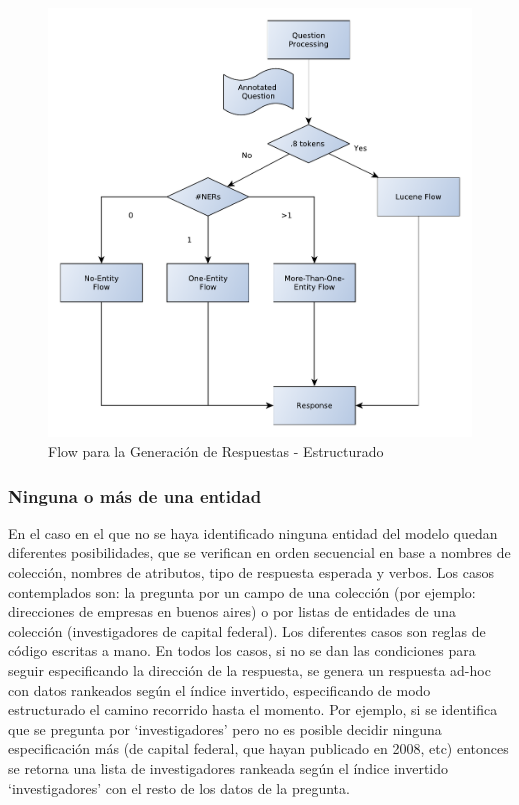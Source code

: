 \begin{figure}[H]
  \centering
    \includegraphics[scale=0.5]{graficos/AnswerRetrievalFlowEstructurado}
  \caption{Flow para la Generación de Respuestas - Estructurado}
  \label{fig:AnswerRetrievalFlowEstructurado}
\end{figure}

\subsubsection*{Ninguna o más de una entidad}
En el caso en el que no se haya identificado ninguna entidad del modelo quedan diferentes posibilidades, que se verifican en orden secuencial en base a nombres de colección, nombres de atributos, tipo de respuesta esperada y verbos. Los casos contemplados son: la pregunta por un campo de una colección (por ejemplo: direcciones de empresas en buenos aires) o por listas de entidades de una colección (investigadores de capital federal). Los diferentes casos son reglas de código escritas a mano. En todos los casos, si no se dan las condiciones para seguir especificando la dirección de la respuesta, se genera un respuesta ad-hoc con datos rankeados según el índice invertido, especificando de modo estructurado el camino recorrido hasta el momento. Por ejemplo, si se identifica que se pregunta por `investigadores' pero no es posible decidir ninguna especificación más (de capital federal, que hayan publicado en 2008, etc) entonces se retorna una lista de investigadores rankeada según el índice invertido `investigadores' con el resto de los datos de la pregunta. 

